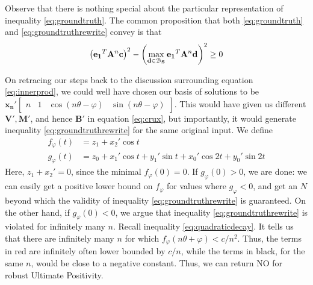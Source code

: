 Observe that there is nothing special about the particular representation of inequality \ref{eq:groundtruth}. The common proposition that both \ref{eq:groundtruth} and \ref{eq:groundtruthrewrite} convey is that 
$$
\left(\mathbf{e_1}^T\mathbf{A}^n\mathbf{c}\right)^2 - \left(\max_{\mathbf{d} \in \mathcal{B}_{\mathbf{S}}} \mathbf{e_1}^T\mathbf{A}^n\mathbf{d}\right)^2 \ge 0
$$

On retracing our steps back to the discussion surrounding equation \ref{eq:innerprod}, we could well have chosen our basis of solutions to be $\mathbf{x_n'}\begin{bmatrix}n & 1 & \cos(n\theta - \varphi) & \sin(n\theta - \varphi) \end{bmatrix}$. This would have given us different $\mathbf{V'}, \mathbf{M'}$, and hence $\mathbf{B'}$ in equation \ref{eq:crux}, but importantly, it would generate inequality \ref{eq:groundtruthrewrite} for the same original input. We define 
\begin{align}
f_\varphi(t) &= z_1 + x_2'\cos t  \\
g_\varphi(t) &= z_0 + x_1'\cos t + y_1'\sin t + x_0'\cos 2t + y_0'\sin 2t
\end{align}
Here, $z_1 + x_2' = 0$, since the minimal $f_\varphi(0) = 0$. If $g_\varphi(0) > 0$, we are done: we can easily get a positive lower bound on $f_\varphi$ for values where $g_\varphi < 0$, and get an $N$ beyond which the validity of inequality \ref{eq:groundtruthrewrite} is guaranteed. On the other hand, if $g_\varphi(0) < 0$, we argue that inequality \ref{eq:groundtruthrewrite} is violated for infinitely many $n$. Recall inequality \ref{eq:quadraticdecay}. It tells us that there are infinitely many $n$ for which $f_\varphi(n\theta + \varphi) < c/n^2$. Thus, the terms in red are infinitely often lower bounded by $c/n$, while the terms in black, for the same $n$, would be close to a negative constant. Thus, we can return NO for robust Ultimate Positivity.

